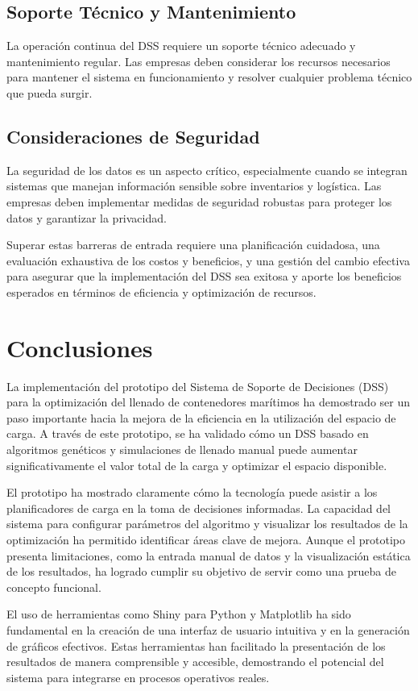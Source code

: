 \documentclass[9pt,a4paper]{rho}
\begin{document}
\subsection{Soporte Técnico y Mantenimiento}
La operación continua del DSS requiere un soporte técnico adecuado y mantenimiento regular. Las empresas deben considerar los recursos necesarios para mantener el sistema en funcionamiento y resolver cualquier problema técnico que pueda surgir.

\subsection{Consideraciones de Seguridad}
La seguridad de los datos es un aspecto crítico, especialmente cuando se integran sistemas que manejan información sensible sobre inventarios y logística. Las empresas deben implementar medidas de seguridad robustas para proteger los datos y garantizar la privacidad.

Superar estas barreras de entrada requiere una planificación cuidadosa, una evaluación exhaustiva de los costos y beneficios, y una gestión del cambio efectiva para asegurar que la implementación del DSS sea exitosa y aporte los beneficios esperados en términos de eficiencia y optimización de recursos.

\section{Conclusiones}
La implementación del prototipo del Sistema de Soporte de Decisiones (DSS) para la optimización del llenado de contenedores marítimos ha demostrado ser un paso importante hacia la mejora de la eficiencia en la utilización del espacio de carga. A través de este prototipo, se ha validado cómo un DSS basado en algoritmos genéticos y simulaciones de llenado manual puede aumentar significativamente el valor total de la carga y optimizar el espacio disponible.

El prototipo ha mostrado claramente cómo la tecnología puede asistir a los planificadores de carga en la toma de decisiones informadas. La capacidad del sistema para configurar parámetros del algoritmo y visualizar los resultados de la optimización ha permitido identificar áreas clave de mejora. Aunque el prototipo presenta limitaciones, como la entrada manual de datos y la visualización estática de los resultados, ha logrado cumplir su objetivo de servir como una prueba de concepto funcional.

El uso de herramientas como Shiny para Python y Matplotlib ha sido fundamental en la creación de una interfaz de usuario intuitiva y en la generación de gráficos efectivos. Estas herramientas han facilitado la presentación de los resultados de manera comprensible y accesible, demostrando el potencial del sistema para integrarse en procesos operativos reales.
\end{document}
